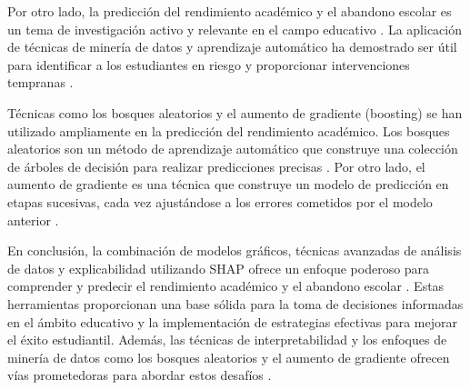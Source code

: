     Por otro lado, la predicción del rendimiento académico y el abandono escolar es un tema de investigación activo y relevante en el campo educativo \cite{garcia2018prediccion, wang2017literature}. La aplicación de técnicas de minería de datos y aprendizaje automático ha demostrado ser útil para identificar a los estudiantes en riesgo y proporcionar intervenciones tempranas \cite{garcia2018prediccion, han2011data}.
    
    Técnicas como los bosques aleatorios \cite{breiman2001random} y el aumento de gradiente (boosting) \cite{friedman2000additive} se han utilizado ampliamente en la predicción del rendimiento académico. Los bosques aleatorios son un método de aprendizaje automático que construye una colección de árboles de decisión para realizar predicciones precisas \cite{breiman2001random}. Por otro lado, el aumento de gradiente es una técnica que construye un modelo de predicción en etapas sucesivas, cada vez ajustándose a los errores cometidos por el modelo anterior \cite{friedman2000additive}.
    
    En conclusión, la combinación de modelos gráficos, técnicas avanzadas de análisis de datos y explicabilidad utilizando SHAP ofrece un enfoque poderoso para comprender y predecir el rendimiento académico y el abandono escolar \cite{garcia2018prediccion, wang2017literature, lundberg2017unified}. Estas herramientas proporcionan una base sólida para la toma de decisiones informadas en el ámbito educativo y la implementación de estrategias efectivas para mejorar el éxito estudiantil. Además, las técnicas de interpretabilidad y los enfoques de minería de datos como los bosques aleatorios y el aumento de gradiente ofrecen vías prometedoras para abordar estos desafíos \cite{kocev2013need, breiman2001random, friedman2000additive}.